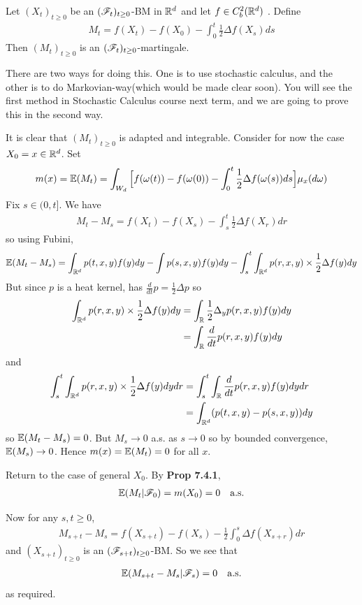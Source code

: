 \documentclass[12pt,a4paper]{report}
\newenvironment{proof}
{\begin{changemargin}{1cm}{0.5cm} 
	}%
	{\end{changemargin}
}
\begin{document}
 Let $(X_t)_{t\geq 0}$ be an $(\mathscr{F}_t)_{t\geq 0}$-BM in $\mathbb{R}^d$ and let $f\in C_b^2(\mathbb{R}^d)$ . Define
\begin{align*}
M_t = f(X_t) - f(X_0) - \int_0^t \frac{1}{2} \Delta f(X_s) ds
\end{align*}
Then $(M_t)_{t\geq 0}$ is an $(\mathscr{F}_t)_{t\geq 0}$-martingale.
\s

There are two ways for doing this. One is to use stochastic calculus, and the other is to do Markovian-way(which would be made clear soon). You will see the first method in Stochastic Calculus course next term, and we are going to prove this in the second way.
\begin{proof}
\pf It is clear that $(M_t)_{t\geq 0}$ is adapted and integrable. Consider for now the case $X_0 =x \in \mathbb{R}^d$. Set
\begin{align*}
m(x) = \mathbb{E}(M_t) = \int_{W_d} \Big[ f(\omega(t)) - f(\omega(0)) -\int_0^t \frac{1}{2} \Delta f(\omega(s)) ds \Big] \mu_x(d\omega) 
\end{align*}
Fix $s\in (0,t]$. We have
\begin{align*}
M_t - M_s = f(X_t) - f(X_s) - \int_s^t \frac{1}{2} \Delta f(X_r) dr
\end{align*}
so using Fubini,
\begin{align*}
\mathbb{E}(M_t - M_s) = \int_{\mathbb{R}^d} p(t,x,y)f(y)dy - \int p(s,x,y) f(y)dy - \int_s^t \int_{\mathbb{R}^d} p(r,x,y) \times \frac{1}{2}\Delta f(y) dy
\end{align*}
But since $p$ is a heat kernel, has $\frac{d}{dt}p = \frac{1}{2} \Delta p$ so
\begin{align*}
\int_{\mathbb{R}^d} p(r,x,y) \times \frac{1}{2} \Delta f(y) dy &= \int_{\mathbb{R}} \frac{1}{2} \Delta_y p(r,x,y) f(y) dy \\
&= \int_{\mathbb{R}} \frac{d}{dt} p(r,x,y) f(y) dy
\end{align*}
and
\begin{align*}
\int_s^t \int_{\mathbb{R}^d} p(r,x,y) \times \frac{1}{2} \Delta f(y) dy dr &= \int_s^t \int_{\mathbb{R}} \frac{d}{dt} p(r,x,y) f(y) dy dr \\
&= \int_{\mathbb{R}^d} (p(t,x,y) - p(s,x,y) ) dy
\end{align*}
so $\mathbb{E}(M_t -M_s) =0$. But $M_s \rightarrow 0$ a.s. as $s\rightarrow 0$ so by bounded convergence, $\mathbb{E}(M_s) \rightarrow 0$. Hence $m(x) = \mathbb{E}(M_t) =0$ for all $x$.

\quad Return to the case of general $X_0$. By \textbf{Prop 7.4.1},
\begin{align*}
\mathbb{E}(M_t | \mathscr{F}_0) = m(X_0) =0 \quad \text{a.s.}
\end{align*}
\s

Now for any $s,t\geq 0$,
\begin{align*}
M_{s+t} - M_s = f(X_{s+t}) - f(X_s) - \frac{1}{2}\int_0^s \Delta f(X_{s+r}) dr
\end{align*}
and $(X_{s+t})_{t\geq 0}$ is an $(\mathscr{F}_{s+t})_{t\geq 0}$-BM. So we see that 
\begin{align*}
\mathbb{E}(M_{s+t} - M_s | \mathscr{F}_s)  =0\quad \text{a.s.}
\end{align*}
as required.

\eop
\end{proof}
\end{document}
